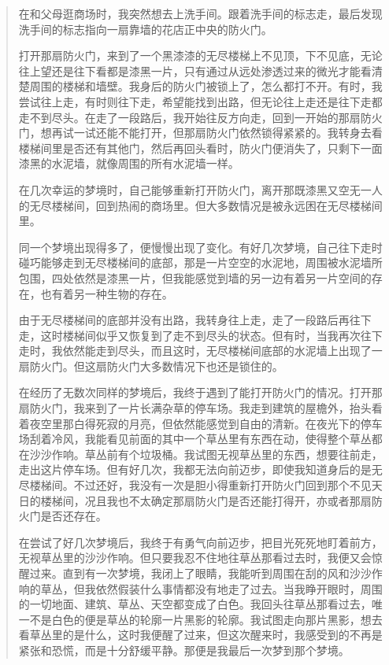 \blockquote{
	在和父母逛商场时，我突然想去上洗手间。跟着洗手间的标志走，最后发现洗手间的标志指向一扇靠墙的花店正中央的防火门。

	打开那扇防火门，来到了一个黑漆漆的无尽楼梯\pozhehao{}上不见顶，下不见底，无论往上望还是往下看都是漆黑一片，只有通过从远处渗透过来的微光才能看清楚周围的楼梯和墙壁。我身后的防火门被锁上了，怎么都打不开。有时，我尝试往上走，有时则往下走，希望能找到出路，但无论往上走还是往下走都走不到尽头。在走了一段路后，我开始往反方向走，回到一开始的那扇防火门，想再试一试还能不能打开，但那扇防火门依然锁得紧紧的。我转身去看楼梯间里是否还有其他门，然后再回头看时，防火门便消失了，只剩下一面漆黑的水泥墙，就像周围的所有水泥墙一样。

	在几次幸运的梦境时，自己能够重新打开防火门，离开那既漆黑又空无一人的无尽楼梯间，回到热闹的商场里。但大多数情况是被永远困在无尽楼梯间里。

	同一个梦境出现得多了，便慢慢出现了变化。有好几次梦境，自己往下走时碰巧能够走到无尽楼梯间的底部，那是一片空空的水泥地，周围被水泥墙所包围，四处依然是漆黑一片，但我能感觉到墙的另一边有着另一片空间的存在，也有着另一种生物的存在。

	由于无尽楼梯间的底部并没有出路，我转身往上走，走了一段路后再往下走，这时楼梯间似乎又恢复到了走不到尽头的状态。但有时，当我再次往下走时，我依然能走到尽头，而且这时，无尽楼梯间底部的水泥墙上出现了一扇防火门。但这扇防火门大多数情况下也还是锁住的。

	在经历了无数次同样的梦境后，我终于遇到了能打开防火门的情况。打开那扇防火门，我来到了一片长满杂草的停车场。我走到建筑的屋檐外，抬头看着夜空里那白得死寂的月亮，但依然能感觉到自由的清新。在夜光下的停车场刮着冷风，我能看见前面的其中一个草丛里有东西在动，使得整个草丛都在沙沙作响。草丛前有个垃圾桶。我试图无视草丛里的东西，想要往前走，走出这片停车场。但有好几次，我都无法向前迈步，即使我知道身后的是无尽楼梯间。不过还好，我没有一次是胆小得重新打开防火门回到那个不见天日的楼梯间，况且我也不太确定那扇防火门是否还能打得开，亦或者那扇防火门是否还存在。

	在尝试了好几次梦境后，我终于有勇气向前迈步，把目光死死地盯着前方，无视草丛里的沙沙作响。但只要我忍不住地往草丛那看过去时，我便又会惊醒过来。直到有一次梦境，我闭上了眼睛，我能听到周围在刮的风和沙沙作响的草丛，但我依然假装什么事情都没有地走了过去。当我睁开眼时，周围的一切\pozhehao{}地面、建筑、草丛、天空\pozhehao{}都变成了白色。我回头往草丛那看过去，唯一不是白色的便是草丛的轮廓\pozhehao{}一片黑影的轮廓。我试图走向那片黑影，想去看草丛里的是什么，这时我便醒了过来，但这次醒来时，我感受到的不再是紧张和恐慌，而是十分舒缓平静。那便是我最后一次梦到那个梦境。

}

